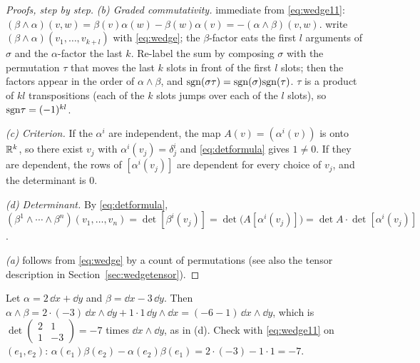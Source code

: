 \begin{proof}[Proofs, step by step]
\emph{(b) Graded commutativity.}  immediate from \eqref{eq:wedge11}:
$(\beta\wedge\alpha)(v,w)=\beta(v)\alpha(w)-\beta(w)\alpha(v)=-(\alpha\wedge\beta)(v,w)$.
 write $(\beta\wedge\alpha)(v_1,\dots,v_{k+l})$ with \eqref{eq:wedge}; the $\beta$-factor eats the first $l$
arguments of $\sigma$ and the $\alpha$-factor the last $k$. Re-label the sum by composing $\sigma$ with the permutation $\tau$ that
moves the last $k$ slots in front of the first $l$ slots; then the factors appear in the order of $\alpha\wedge\beta$, and
$\mathrm{sgn}(\sigma\tau)=\mathrm{sgn}(\sigma)\mathrm{sgn}(\tau)$.  $\tau$ is a product of $kl$ transpositions (each of the $k$ slots jumps
over each of the $l$ slots), so $\mathrm{sgn}\tau=(-1)^{kl}$.

\emph{(c) Criterion.} If the $\alpha^i$ are independent, the map $A(v)=(\alpha^i(v))$ is onto $\mathbb{R}^k$, so there exist $v_j$ with
$\alpha^i(v_j)=\delta^i_j$ and \eqref{eq:detformula} gives $1\neq0$. If they are dependent, the rows of $[\alpha^i(v_j)]$ are dependent
for every choice of $v_j$, and the determinant is $0$.

\emph{(d) Determinant.} By \eqref{eq:detformula}, $(\beta^1\wedge\cdots\wedge\beta^n)(v_1,\dots,v_n)=\det[\beta^i(v_j)]=\det\bigl(A[\alpha^i(v_j)]\bigr)=\det A\cdot\det[\alpha^i(v_j)]$.

\emph{(a)} follows from \eqref{eq:wedge} by a count of permutations (see also the tensor description in
Section~\ref{sec:wedgetensor}).
\end{proof}


\begin{example}\label{ex:wedge2}
Let $\alpha=2\,\dd x+\dd y$ and $\beta=\dd x-3\,\dd y$. Then $\alpha\wedge\beta=2\cdot(-3)\,\dd x\wedge\dd y+1\cdot1\,\dd y\wedge\dd x
=(-6-1)\,\dd x\wedge\dd y$, which is $\det\begin{pmatrix}2&1\\1&-3\end{pmatrix}=-7$ times $\dd x\wedge\dd y$, as in (d). Check with
\eqref{eq:wedge11} on $(e_1,e_2)$: $\alpha(e_1)\beta(e_2)-\alpha(e_2)\beta(e_1)=2\cdot(-3)-1\cdot1=-7$.
\end{example}
